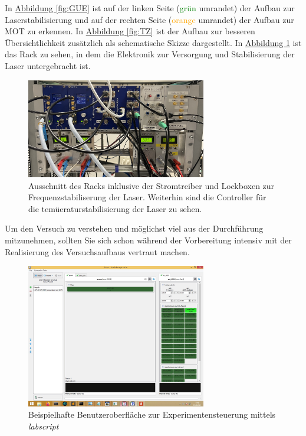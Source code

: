 \documentclass[
class=book,
accentcolor=1b,
custommargins=geometry,
fontsize=11pt,
thesis={type=Versuchsanleitung},
ruledheaders=all,
headline=false,
instbox=false,
marginpar=false,
title=small,
ignore-missing-data=true,
twoside=false,
logofile=apqdesign/tuda_logo.pdf,
pdfa=false %
]{apqpub}
\begin{document}
In \hyperref[fig:GUE]{Abbildung \ref{fig:GUE}} ist auf der linken Seite (\textcolor{green}{grün} umrandet) der Aufbau zur Laserstabilisierung und auf der rechten Seite (\textcolor{orange}{orange} umrandet) der Aufbau zur MOT zu erkennen.
In \hyperref[fig:TZ]{Abbildung \ref{fig:TZ}} ist der Aufbau zur besseren Übersichtlichkeit zusätzlich als schematische Skizze dargestellt.
In \hyperref[fig:Rack]{Abbildung \ref{fig:Rack}} ist das Rack zu sehen, in dem die Elektronik zur Versorgung und Stabilisierung der Laser untergebracht ist.
\begin{figure}[htb!]
	\centering
	\includegraphics[width=0.7\textwidth]{graphics/Rack_new.jpg}
	\caption{Ausschnitt des Racks inklusive der Stromtreiber und Lockboxen zur Frequenzstabiliserung der Laser. Weiterhin sind die Controller für die temüeraturstabilisierung der Laser zu sehen.}
	\label{fig:Rack}
\end{figure} 
Um den Versuch zu verstehen und möglichst viel aus der Durchführung mitzunehmen, sollten Sie sich schon während der Vorbereitung intensiv mit der Realisierung des Versuchsaufbaus vertraut machen. 
\begin{figure}[htb!]
	\centering
	\includegraphics[width=0.7\textwidth]{graphics/BLACS.jpg}
	\caption{Beispielhafte Benutzeroberfläche zur Experimentensteuerung mittels \textit{labscript}}
	\label{fig:ES}
\end{figure}
\end{document}
